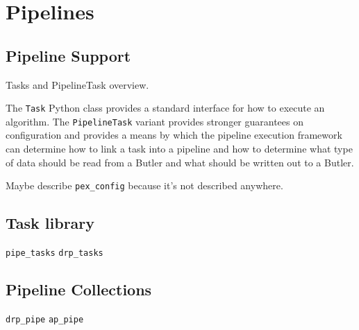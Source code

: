 \section{Pipelines}
\label{sec:pipe}

\subsection{Pipeline Support}

Tasks and PipelineTask overview.

The \texttt{Task} Python class provides a standard interface for how to execute an algorithm.
The \texttt{PipelineTask} variant provides stronger guarantees on configuration and provides a means by which the pipeline execution framework can determine how to link a task into a pipeline and how to determine what type of data should be read from a Butler and what should be written out to a Butler.

Maybe describe \texttt{pex\_config} because it's not described anywhere.

\subsection{Task library}

\texttt{pipe\_tasks}
\texttt{drp\_tasks}

\subsection{Pipeline Collections}

\texttt{drp\_pipe}
\texttt{ap\_pipe}
